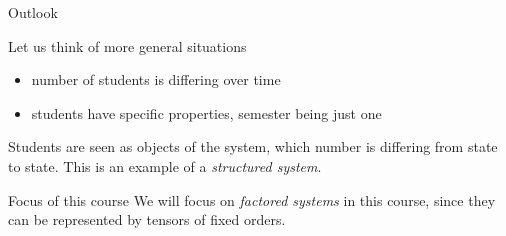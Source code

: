 \documentclass{beamer}
\begin{document}
    \begin{frame}{Outlook}

        Let us think of more general situations
        \begin{itemize}
            \item number of students is differing over time
            \item students have specific properties, semester being just one
        \end{itemize}

        \medskip

        Students are seen as objects of the system, which number is differing from state to state.
        This is an example of a \emph{structured system}.

        \medskip

        \begin{block}{Focus of this course}
            We will focus on \emph{factored systems} in this course, since they can be represented by tensors of fixed orders.
        \end{block}


    \end{frame}
\end{document}
